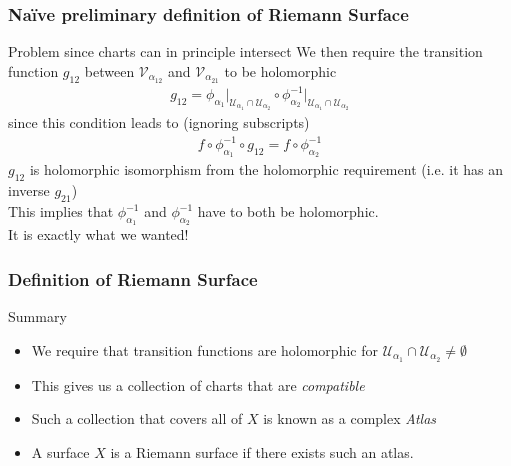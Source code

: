 \documentclass{beamer}[10]
\begin{document}
\begin{frame}
	\frametitle{Naïve preliminary definition of Riemann Surface}
	\begin{block}{Problem since charts can in principle intersect}
	We then require the transition function $g_{12}$ between $\mathcal{V}_{\alpha_{12}}$ and $\mathcal{V}_{\alpha_{21}}$ to be holomorphic
	\begin{equation}
		\begin{aligned}
			g_{12}=\phi_{\alpha_1}\big|_{\mathcal{U}_{\alpha_1}\cap \mathcal{U}_{\alpha_2}}\circ \phi_{\alpha_2}^{-1}\big|_{\mathcal{U}_{\alpha_1}\cap \mathcal{U}_{\alpha_2}}
		\end{aligned}
	\end{equation}
	since this condition leads to (ignoring subscripts)
	\begin{equation}
		\begin{aligned}
			f\circ \phi_{\alpha_1}^{-1}\circ g_{12}=f\circ \phi_{\alpha_2}^{-1}
		\end{aligned}
	\end{equation}
$g_{12}$ is holomorphic isomorphism from the holomorphic requirement (i.e. it has an inverse $g_{21}$)\\ This implies that
	$\phi^{-1}_{\alpha_1}$ and $\phi^{-1}_{\alpha_2}$ have to both be holomorphic. \\
	It is exactly what we wanted!
	\end{block}
\end{frame} 

\begin{frame}
	\frametitle{Definition of Riemann Surface}
	\begin{block}{Summary}
	\begin{itemize}
		\item We require that transition functions are holomorphic for $\mathcal{U}_{\alpha_1}\cap \mathcal{U}_{\alpha_2}\neq \emptyset$
		\item This gives us a collection of charts that are \textit{compatible}
		\item Such a collection that covers all of $X$ is known as a complex \textit{Atlas}
		\item A surface $X$ is a Riemann surface if there exists such an atlas.
	\end{itemize}
	\end{block}
\end{frame} 
\end{document}
